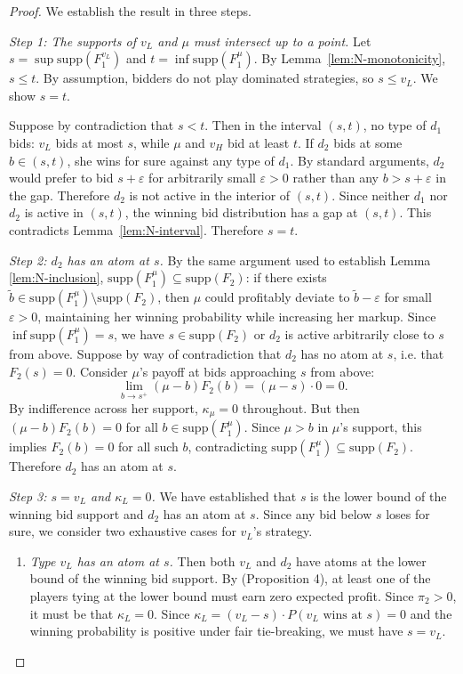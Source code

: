 \begin{proof}
We establish the result in three steps.

\noindent \textit{Step 1: The supports of $v_L$ and $\mu$ must intersect up to a point.}
Let $s = \sup \text{supp}(F_1^{v_L})$ and $t = \inf \text{supp}(F_1^{\mu})$. By Lemma~\ref{lem:N-monotonicity}, $s \leq t$. By assumption, bidders do not play dominated strategies, so $s \leq v_L$. We show $s = t$.

\noindent Suppose by contradiction that $s < t$. Then in the interval $(s, t)$, no type of $d_1$ bids: $v_L$ bids at most $s$, while $\mu$ and $v_H$ bid at least $t$. If $d_2$ bids at some $b \in (s, t)$, she wins for sure against any type of $d_1$. By standard arguments, $d_2$ would prefer to bid $s + \varepsilon$ for arbitrarily small $\varepsilon > 0$ rather than any $b > s + \varepsilon$ in the gap. Therefore $d_2$ is not active in the interior of $(s, t)$. Since neither $d_1$ nor $d_2$ is active in $(s, t)$, the winning bid distribution has a gap at $(s, t)$. This contradicts Lemma~\ref{lem:N-interval}. Therefore $s = t$.

\noindent \textit{Step 2: $d_2$ has an atom at $s$.}
By the same argument used to establish Lemma \ref{lem:N-inclusion}, $\text{supp}(F_1^{\mu}) \subseteq \text{supp}(F_2)$: if there exists $\tilde{b} \in \text{supp}(F_1^{\mu}) \setminus \text{supp}(F_2)$, then $\mu$ could profitably deviate to $\tilde{b} - \varepsilon$ for small $\varepsilon > 0$, maintaining her winning probability while increasing her markup. Since $\inf \text{supp}(F_1^{\mu}) = s$, we have $s \in \text{supp}(F_2)$ or $d_2$ is active arbitrarily close to $s$ from above.
\noindent Suppose by way of contradiction that $d_2$ has no atom at $s$, i.e. that $F_2(s) = 0$. Consider $\mu$'s payoff at bids approaching $s$ from above:
\[
\lim_{b \to s^+} (\mu - b) F_2(b) = (\mu - s) \cdot 0 = 0.
\]
By indifference across her support, $\kappa_{\mu} = 0$ throughout. But then $(\mu - b) F_2(b) = 0$ for all $b \in \text{supp}(F_1^{\mu})$. Since $\mu > b$ in $\mu$'s support, this implies $F_2(b) = 0$ for all such $b$, contradicting $\text{supp}(F_1^{\mu}) \subseteq \text{supp}(F_2)$. Therefore $d_2$ has an atom at $s$.

\noindent \textit{Step 3: $s = v_L$ and $\kappa_L = 0$.}
We have established that $s$ is the lower bound of the winning bid support and $d_2$ has an atom at $s$. Since any bid below $s$ loses for sure, we consider two exhaustive cases for $v_L$'s strategy.
\begin{enumerate}
    \item \textit{Type $v_L$ has an atom at $s$.} Then both $v_L$ and $d_2$ have atoms at the lower bound of the winning bid support. By \textcite{maskinEquilibriumSealedHigh2000} (Proposition 4), at least one of the players tying at the lower bound must earn zero expected profit. Since $\pi_2 > 0$, it must be that $\kappa_L = 0$. Since $\kappa_L = (v_L - s) \cdot P(v_L \text{ wins at } s) = 0$ and the winning probability is positive under fair tie-breaking, we must have $s = v_L$.


\end{enumerate}
\end{proof}
